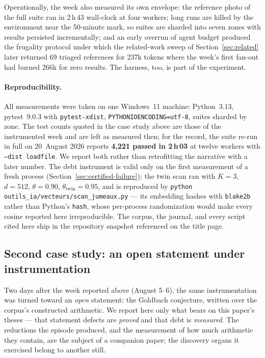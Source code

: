 \documentclass[11pt]{article}
\theoremstyle{remark}\newtheorem{example}{Example}
\begin{document}
Operationally, the week also measured its own envelope: the reference photo of the
full suite ran in 2\,h\,43 wall-clock at four workers; long runs are killed by the
environment near the 50-minute mark, so suites are sharded into seven zones with
results persisted incrementally; and an early overrun of agent budget produced the
frugality protocol under which the related-work sweep of Section~\ref{sec:related}
later returned 69 triaged references for 237k tokens where the week's first fan-out
had burned 266k for zero results. The harness, too, is part of the experiment.

\paragraph{Reproducibility.} All measurements were taken on one Windows~11 machine:
Python~3.13, pytest~9.0.3 with \texttt{pytest-xdist}, \texttt{PYTHONIOENCODING=utf-8},
suites sharded by zone. The test counts quoted in the case study above are those of the
instrumented week and are left as measured then; for the record, the suite re-run in
full on 20~August 2026 reports \textbf{4{,}221 passed in 2\,h\,03} at twelve workers
with \texttt{--dist loadfile}. We report both rather than retrofitting the narrative
with a later number. The debt instrument is valid
only on the first measurement of a fresh process
(Section~\ref{sec:certified-failure}); the twin scan ran with $K = 3$, $d = 512$,
$\theta = 0.90$, $\theta_{\mathrm{twin}} = 0.95$, and is reproduced by
\texttt{python outils\_ia/\allowbreak vecteurs/\allowbreak scan\_jumeaux.py}
--- its embedding hashes with \texttt{blake2b} rather than Python's \texttt{hash}, whose
per-process randomization would make every cosine reported here irreproducible. The
corpus, the journal, and every script cited here ship in the repository snapshot
referenced on the title page.

\subsection{Second case study: an open statement under instrumentation}
\label{sec:goldbach}

Two days after the week reported above (August 5--6), the same instrumentation was
turned toward an \emph{open} statement: the Goldbach conjecture, written over the
corpus's constructed arithmetic. We report here only what bears on this paper's
theses --- that statement defects are \emph{proved} and that debt is \emph{measured}.
The reductions the episode produced, and the measurement of how much arithmetic they
contain, are the subject of a companion paper; the discovery organs it exercised belong
to another still.
\end{document}
